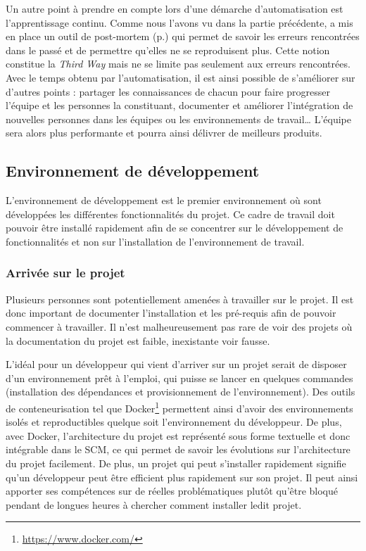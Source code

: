 Un autre point à prendre en compte lors d'une démarche d'automatisation est l'apprentissage continu. Comme nous l'avons vu dans la partie précédente, \etsy{} a mis en place un outil de post-mortem (p.\pageref{post-mortem}) qui permet de savoir les erreurs rencontrées dans le passé et de permettre qu'elles ne se reproduisent plus. Cette notion constitue la \emph{Third Way} mais ne se limite pas seulement aux erreurs rencontrées. Avec le temps obtenu par l'automatisation, il est ainsi possible de s'améliorer sur d'autres points : partager les connaissances de chacun pour faire progresser l'équipe et les personnes la constituant, documenter et améliorer l'intégration de nouvelles personnes dans les équipes ou les environnements de travail\ldots{} L'équipe sera alors plus performante et pourra ainsi délivrer de meilleurs produits.

\subsection{Environnement de développement}

L'environnement de développement est le premier environnement où sont développées les différentes fonctionnalités du projet. Ce cadre de travail doit pouvoir être installé rapidement afin de se concentrer sur le développement de fonctionnalités et non sur l'installation de l'environnement de travail.

\subsubsection{Arrivée sur le projet}

Plusieurs personnes sont potentiellement amenées à travailler sur le projet. Il est donc important de documenter l'installation et les pré-requis afin de pouvoir commencer à travailler. Il n'est malheureusement pas rare de voir des projets où la documentation du projet est faible, inexistante voir fausse.

L'idéal pour un développeur qui vient d'arriver sur un projet serait de disposer d'un environnement prêt à l'emploi, qui puisse se lancer en quelques commandes (installation des dépendances et provisionnement de l'environnement). Des outils de conteneurisation tel que Docker\footnote{\url{https://www.docker.com/}} permettent ainsi d'avoir des environnements isolés et reproductibles quelque soit l'environnement du développeur. De plus, avec Docker, l'architecture du projet est représenté sous forme textuelle et donc intégrable dans le \gls{SCM}, ce qui permet de savoir les évolutions sur l'architecture du projet facilement. De plus, un projet qui peut s'installer rapidement signifie qu'un développeur peut être efficient plus rapidement sur son projet. Il peut ainsi apporter ses compétences sur de réelles problématiques plutôt qu'être bloqué pendant de longues heures à chercher comment installer ledit projet.

